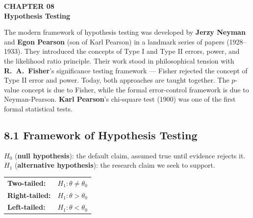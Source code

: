 \documentclass[12pt]{article}
\begin{document}
\newpage

\begin{tcolorbox}[enhanced,arc=0pt,boxrule=0pt,colback=primary,colframe=primary,
  left=16pt,right=16pt,top=14pt,bottom=10pt,borderline south={4pt}{0pt}{accent}]
  {\color{accent!70}\small\bfseries CHAPTER 08}\\[4pt]
  {\LARGE\bfseries\color{white}Hypothesis Testing}
\end{tcolorbox}
\vspace{10pt}

\begin{histbox}
The modern framework of hypothesis testing was developed by \textbf{Jerzy Neyman} and \textbf{Egon Pearson} (son of Karl Pearson) in a landmark series of papers (1928--1933). They introduced the concepts of Type I and Type II errors, power, and the likelihood ratio principle. Their work stood in philosophical tension with \textbf{R.\ A.\ Fisher}'s significance testing framework --- Fisher rejected the concept of Type II error and power. Today, both approaches are taught together. The $p$-value concept is due to Fisher, while the formal error-control framework is due to Neyman-Pearson. \textbf{Karl Pearson}'s chi-square test (1900) was one of the first formal statistical tests.
\end{histbox}

\bigskip

\subsection{8.1 Framework of Hypothesis Testing}

\begin{defbox}
$H_0$ (\textbf{null hypothesis}): the default claim, assumed true until evidence rejects it.\\
$H_1$ (\textbf{alternative hypothesis}): the research claim we seek to support.\\[6pt]
\begin{tabular}{ll}
\textbf{Two-tailed:} & $H_1:\theta\neq\theta_0$\\
\textbf{Right-tailed:} & $H_1:\theta>\theta_0$\\
\textbf{Left-tailed:} & $H_1:\theta<\theta_0$\\
\end{tabular}
\end{defbox}
\end{document}
